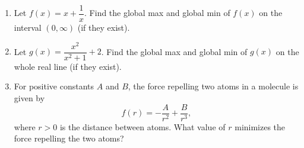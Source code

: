 \documentclass[11pt]{article}
\begin{document}
\drawtitle
\begin{enumerate}
\item Let $f(x)=x+\dfrac{1}{x}$. Find the global max and global min of
  $f(x)$ on the interval $(0,\infty)$ (if they exist).
\vfill

\item Let $g(x)=\dfrac{x^2}{x^2+1}+2$.  Find the global max and global
  min of $g(x)$ on the whole real line (if they exist).
\vfill

\newpage

\item For positive constants $A$ and $B$, the force repelling two atoms
  in a molecule is given by
  \[
  f(r)=-\dfrac{A}{r^2}+\dfrac{B}{r^3},
  \]
  where $r>0$ is the distance between atoms. What value of $r$
  minimizes the force repelling the two atoms?


\end{enumerate}
\end{document}

